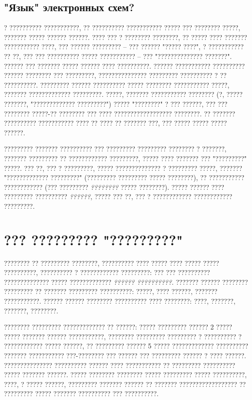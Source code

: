 \subsection{"Язык" электронных схем?}

? ?????????? ???????????, ?? ?????????? ??????????? ????? ??? ???????? ?????, ??????? ????? ?????? ??????.  ???? ??? ? ???????? ????????, ?? ????? ???? ??????? ??????????? ????, ??? ?????? ????????? -- ??? ?????? "????? ????", ? ??????????? ?? ??, ??? ??? ?????????? ????? ??????????? -- ??? "?????????????? ???????".  ?????? ??? ??????? ????? ?????? ???? ??????????.  ?????? ??????????? ?????????? ?????? ???????? ??? ?????????, ??????????????? ????????? ?????????? ? ?? ??????????.  ????????? ?????? ?????????? ????? ???????? ??????????? ?????, ??????? ????????????? ?????????.  ?????, ??????? ??????????? ???????? (?, ????? ???????, "????????????? ?????????") ????? "????????" ? ??? ??????, ??? ??? ???????? ?????-?? ???????? ??? ???? ?????????????????? ????????.  ?? ??????? ?????????? ??????????? ???? ?? ???? ?? ??????? ???, ??? ????? ????? ????? ??????.

????????? ??????? ?????????? ??? ????????? ????????? ???????? ? ???????, ??????? ????????? ?? ???????????? ?????????, ????? ???? ??????? ??? "?????????" ?????.  ??? ??, ??? ? ?????????, ????? ?????????????? ? ????????? ?????, ??????? "????????????? ?????????" (????????? ????????? ????? ????????), ?? ??????????? ???????????? (??? ????????? \emph{????????} ????? ????????).  ????? ?????? ???? ????????? ?????????? \emph{??????}, ????? ??? ??, ??? ? ???????????? ???????????? ?????????.

\section{??? ????????? "?????????"}

???????? ?? ????????? ????????, ?????????? ???? ????? ???? ????? ????? ??????????, ?????????? ? ???????????? ?????????: ??? ??? ?????????? ?????????????? ????? ????????????? \emph{?????? ??????????}.  ??????? ?????? ???????? ????????? ?? ??????? ????????? ??????????: ?????, ???? ??????, ??????? ???????????.  ?????? ?????? ???????? ?????????? ???? ????????: ????, ???????, ???????, ????????.

???????? ????????? ????????????? ?? ??????: ????? ????????? ?????? 2 ????? ????? ??????? ?????? ???????????, ???????? ????????? ????????? ? ?????????? ? ???????????? ????? ??????, ?? ????????? ?????? 5 ????? ????????????? ?????????? ??????? ??????????? ???-???????? ??? ?????? ??? ????????? ?????? ? ???? ??????.  ??????????????? ?????????? ?????? ???? ??????????? ?? ????????? ?????????? ????? ??????? ??????.  ????? ???????? ???????? ????? ????????? ????? ??????????, ????, ? ????? ??????, ????????? ??????? ?????? ?? ??????? ?????????????????? ?? ????????? ????? ??????? ?????????? ??? ??????????.

